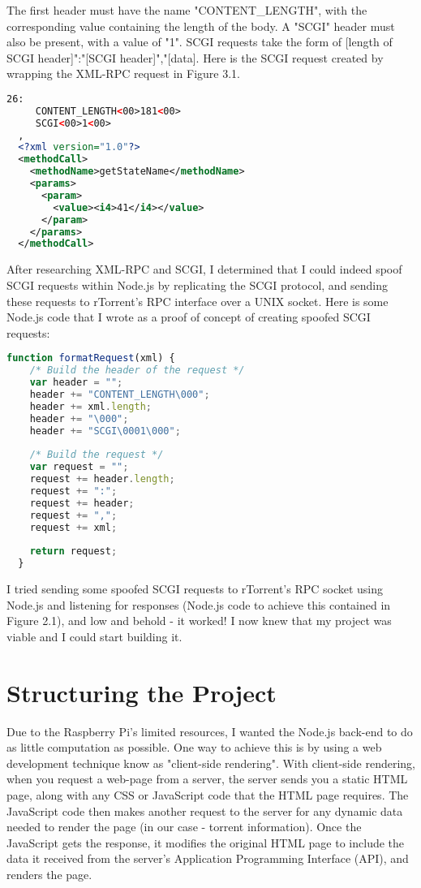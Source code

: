 The first header must have the name "CONTENT\_LENGTH", with the corresponding value containing the length of the body. A "SCGI" header must also be present, with a value of "1". SCGI requests take the form of [length of SCGI header]":"[SCGI header]","[data]. Here is the SCGI request created by wrapping the XML-RPC request in Figure 3.1. 

\vspace{20px}
\begin{lstlisting}[caption=Layout of a SCGI request, language=XML]
  26:
     CONTENT_LENGTH<00>181<00>
     SCGI<00>1<00>
  ,
  <?xml version="1.0"?>
  <methodCall>
    <methodName>getStateName</methodName>
    <params>
      <param>
        <value><i4>41</i4></value>
      </param>
    </params>
  </methodCall>
\end{lstlisting}


After researching XML-RPC and SCGI, I determined that I could indeed spoof SCGI requests within Node.js by replicating the SCGI protocol, and sending these requests to rTorrent's RPC interface over a UNIX socket. Here is some Node.js code that I wrote as a proof of concept of creating spoofed SCGI requests:

\vspace{20px}
\begin{lstlisting}[caption=Layout of a SCGI request, language=JavaScript]
  function formatRequest(xml) {  
    /* Build the header of the request */
    var header = "";
    header += "CONTENT_LENGTH\000";
    header += xml.length;
    header += "\000";
    header += "SCGI\0001\000";
  
    /* Build the request */
    var request = "";
    request += header.length;
    request += ":";
    request += header;
    request += ",";
    request += xml;
  
    return request;
  }
\end{lstlisting}

I tried sending some spoofed SCGI requests to rTorrent's RPC socket using Node.js and listening for responses (Node.js code to achieve this contained in Figure 2.1), and low and behold - it worked! I now knew that my project was viable and I could start building it.


\section{Structuring the Project}
Due to the Raspberry Pi's limited resources, I wanted the Node.js back-end to do as little computation as possible. One way to achieve this is by using a web development technique know as "client-side rendering". With client-side rendering, when you request a web-page from a server, the server sends you a static HTML page, along with any CSS or JavaScript code that the HTML page requires. The JavaScript code then makes another request to the server for any dynamic data needed to render the page (in our case - torrent information). Once the JavaScript gets the response, it modifies the original HTML page to include the data it received from the server's Application Programming Interface (API), and renders the page.

